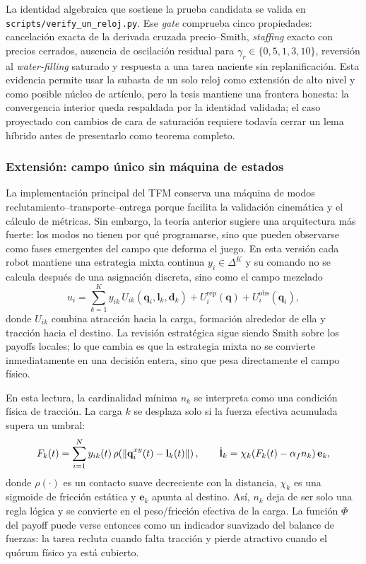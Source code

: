 La identidad algebraica que sostiene la prueba candidata se valida en
\texttt{scripts/verify\_un\_reloj.py}. Ese \emph{gate} comprueba cinco propiedades:
cancelación exacta de la derivada cruzada precio--Smith, \emph{staffing} exacto con
precios cerrados, ausencia de oscilación residual para
$\gamma_r\in\{0{,}5,1,3,10\}$, reversión al \emph{water-filling} saturado y respuesta a
una tarea naciente sin replanificación. Esta evidencia permite usar la subasta de un
solo reloj como extensión de alto nivel y como posible núcleo de artículo, pero la tesis
mantiene una frontera honesta: la convergencia interior queda respaldada por la identidad
validada; el caso proyectado con cambios de cara de saturación requiere todavía cerrar
un lema híbrido antes de presentarlo como teorema completo.

\subsubsection{Extensión: campo único sin máquina de estados}
\label{subsubsec:campo_unico}

La implementación principal del TFM conserva una máquina de modos
reclutamiento--transporte--entrega porque facilita la validación cinemática y el cálculo
de métricas. Sin embargo, la teoría anterior sugiere una arquitectura más fuerte: los
modos no tienen por qué programarse, sino que pueden observarse como fases emergentes
del campo que deforma el juego. En esta versión cada robot mantiene una estrategia
mixta continua $y_i\in\Delta^{K}$ y su comando no se calcula después de una asignación
discreta, sino como el campo mezclado
\begin{equation}
  u_i =
  \sum_{k=1}^{K} y_{ik}\,U_{ik}(\mathbf{q}_i,\mathbf{l}_k,\mathbf{d}_k)
  + U_i^{\mathrm{rep}}(\mathbf{q})
  + U_i^{\mathrm{obs}}(\mathbf{q}_i),
  \label{eq:campo_unico}
\end{equation}
donde $U_{ik}$ combina atracción hacia la carga, formación alrededor de ella y tracción
hacia el destino. La revisión estratégica sigue siendo Smith sobre los payoffs locales;
lo que cambia es que la estrategia mixta no se convierte inmediatamente en una decisión
entera, sino que pesa directamente el campo físico.

En esta lectura, la cardinalidad mínima $n_k$ se interpreta como una condición física de
tracción. La carga $k$ se desplaza solo si la fuerza efectiva acumulada supera un umbral:
\begin{equation}
  F_k(t)=\sum_{i=1}^{N} y_{ik}(t)\,
  \rho\!\left(\left\|\mathbf{q}_i^{xy}(t)-\mathbf{l}_k(t)\right\|\right),
  \qquad
  \dot{\mathbf{l}}_k =
  \chi_k\!\left(F_k(t)-\alpha_f n_k\right)
  \mathbf{e}_k,
  \label{eq:campo_unico_carga}
\end{equation}
donde $\rho(\cdot)$ es un contacto suave decreciente con la distancia,
$\chi_k$ es una sigmoide de fricción estática y $\mathbf{e}_k$ apunta al destino. Así,
$n_k$ deja de ser solo una regla lógica y se convierte en el peso/fricción efectiva de
la carga. La función $\Phi$ del payoff puede verse entonces como un indicador suavizado
del balance de fuerzas: la tarea recluta cuando falta tracción y pierde atractivo cuando
el quórum físico ya está cubierto.

